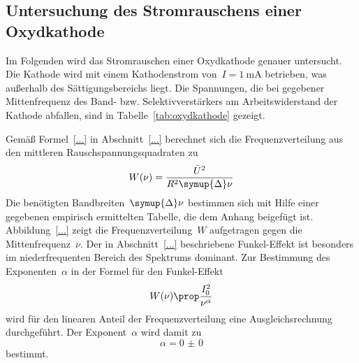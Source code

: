 \subsection{Untersuchung des Stromrauschens einer Oxydkathode}

Im Folgenden wird das Stromrauschen einer Oxydkathode genauer untersucht. Die
Kathode wird mit einem Kathodenstrom von~$I=\SI{1}{\milli\ampere}$ betrieben,
was außerhalb des Sättigungsbereichs liegt. Die Spannungen, die bei gegebener
Mittenfrequenz des Band- bzw. Selektivverstärkers am Arbeitswiderstand der
Kathode abfallen, sind in Tabelle~\ref{tab:oxydkathode} gezeigt.

Gemäß Formel~\ref{...} in Abschnitt~\ref{...} berechnet sich die
Frequenzverteilung aus den mittleren Rauschspannungsquadraten zu
%
\begin{equation}
  W(\nu)=\frac{\bar{U}^2}{R^2\symup{\Delta}\nu}
\end{equation}
%
Die benötigten Bandbreiten~$\symup{\Delta}\nu$ bestimmen sich mit Hilfe einer
gegebenen empirisch ermittelten Tabelle, die dem Anhang beigefügt ist.
Abbildung~\ref{...} zeigt die Frequenzverteilung~$W$ aufgetragen gegen die
Mittenfrequenz~$\nu$. Der in Abschnitt~\ref{...} beschriebene Funkel-Effekt ist besonders im niederfrequenten Bereich des Spektrums dominant. Zur Bestimmung des Exponenten~$\alpha$ in der Formel für den Funkel-Effekt
%
\begin{equation}
  W(\nu)\prop\frac{I_0^2}{\nu^{\alpha}}
\end{equation}
%
wird für den linearen Anteil der Frequenzverteilung eine Ausgleichsrechnung durchgeführt. Der Exponent~$\alpha$ wird damit zu
%
\begin{equation}
  \alpha=\num{0(0)}
\end{equation}
%
bestimmt.
